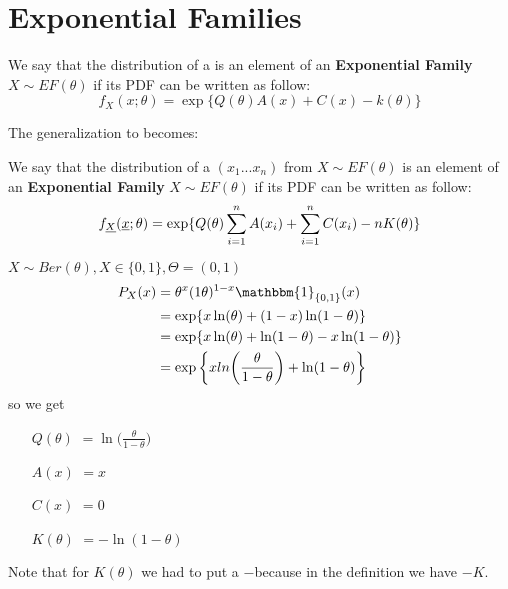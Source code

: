 \section{Exponential Families}
\begin{defi}
	We say that the distribution of a \rv is an element of an \textbf{Exponential Family}	$X\sim EF(\theta)$ if its PDF can be written as follow:
	$$f_X(x;\theta)=\exp \{ Q(\theta)A(x)+ C(x) -k(\theta) \}$$
\end{defi}
The generalization to \rs becomes:
\begin{defi}
	We say that the distribution of a \rs $(x_1...x_n)$ from $X\sim EF(\theta)$ is an element of an \textbf{Exponential Family}	$X\sim EF(\theta)$ if its PDF can be written as follow:
	$$f_{\underline X}(\underline{x};\theta)=\exp \{ Q(\theta)\sum_{i=1}^{n}A(x_i)+ \sum_{i=1}^{n} C(x_i) -nK(\theta) \}$$
\end{defi}
\begin{eg}
	$X\sim Ber(\theta),X\in\{0,1\}, \Theta=(0,1)$
	\[
	\begin{split}
	P_X(x)
	&=\theta^x (1\theta)^{1-x}\mathbbm{1}_{\{0,1\}}(x)\\
	&=\exp\{x\ln(\theta)+(1-x)\ln(1-\theta)  \}\\
	&=\exp\{x\ln(\theta)+\ln(1-\theta)-x\ln(1-\theta)  \}\\
	&=\exp\bigg\{xln{\bigg(\frac{\theta}{1-\theta}\bigg)}+\ln(1-\theta)\bigg\}
	\end{split}
	\]
	so we get 
	\begin{itemize}
		\item[$Q(\theta)$]$=\ln\bigg( \frac{\theta}{1-\theta} \bigg)$
		\item[$A(x)$]$=x$
		\item[$C(x)$]$=0$
		\item[$K(\theta)$]$=-\ln(1-\theta)$
	\end{itemize}
	Note that for $K(\theta)$ we had to put a $-$because in the definition we have $-K$.
\end{eg}


